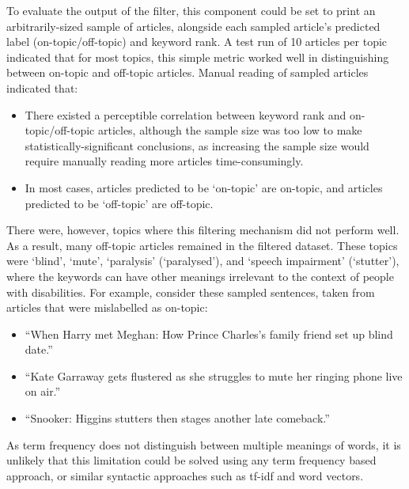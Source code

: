 \documentclass{report}
\begin{document}
To evaluate the output of the filter, this component could be set to print an arbitrarily-sized sample of articles, alongside each sampled article's predicted label (on-topic/off-topic) and keyword rank.
A test run of 10 articles per topic indicated that for most topics, this simple metric worked well in distinguishing between on-topic and off-topic articles.
Manual reading of sampled articles indicated that:
\begin{itemize}
	\item There existed a perceptible correlation between keyword rank and on-topic/off-topic articles, although the sample size was too low to make statistically-significant conclusions, as increasing the sample size would require manually reading more articles time-consumingly.
	\item In most cases, articles predicted to be `on-topic' are on-topic, and articles predicted to be `off-topic' are off-topic.
\end{itemize}

There were, however, topics where this filtering mechanism did not perform well.
As a result, many off-topic articles remained in the filtered dataset.
These topics were `blind', `mute', `paralysis' (`paralysed'), and `speech impairment' (`stutter'), where the keywords can have other meanings irrelevant to the context of people with disabilities.
For example, consider these sampled sentences, taken from articles that were mislabelled as on-topic:
\begin{itemize}
	\item ``When Harry met Meghan: How Prince Charles's family friend set up blind date.''
	\item ``Kate Garraway gets flustered as she struggles to mute her ringing phone live on air.''
	\item ``Snooker: Higgins stutters then stages another late comeback.''
\end{itemize}
As term frequency does not distinguish between multiple meanings of words, it is unlikely that this limitation could be solved using any term frequency based approach, or similar syntactic approaches such as tf-idf and word vectors.
\end{document}
